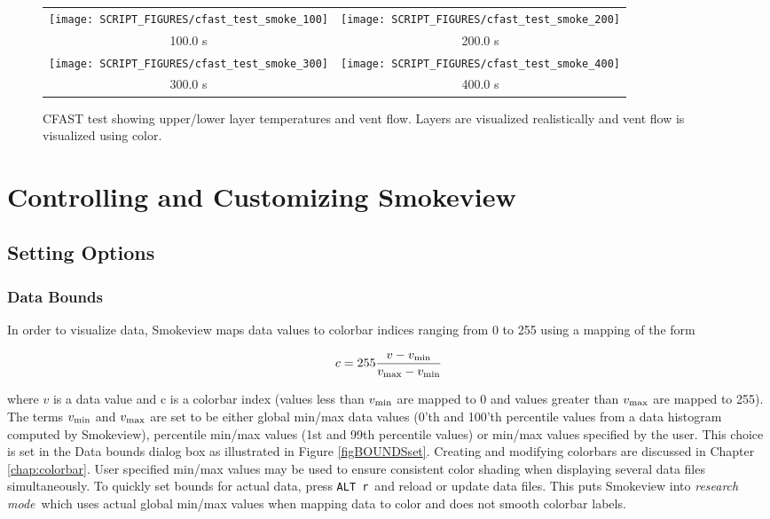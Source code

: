 \documentclass[11pt,twoside]{book}
\begin{document}
\begin{figure}[bph]
\begin{center}
\begin{tabular}{cc}
\texttt{[image: SCRIPT\_FIGURES/cfast\_test\_smoke\_100]}&
\texttt{[image: SCRIPT\_FIGURES/cfast\_test\_smoke\_200]}\\
100.0 s&200.0 s\\
\texttt{[image: SCRIPT\_FIGURES/cfast\_test\_smoke\_300]}&
\texttt{[image: SCRIPT\_FIGURES/cfast\_test\_smoke\_400]}\\
300.0 s&400.0 s\\
\end{tabular}
\end{center}
\caption{CFAST test showing upper/lower layer temperatures and vent flow.
Layers are visualized realistically and vent flow
is visualized using color.}
\label{figcfastsmoke}%
\end{figure}

\part{Controlling and Customizing Smokeview}

\chapter{Setting Options}
\label{chapter:settingoptions}
\section{Data Bounds}

In order to visualize data, Smokeview maps data values to colorbar indices ranging from 0 to 255 using a mapping of the form

\begin{eqnarray*}
c=255 \frac{v-v_{\rm min}}{v_{\rm max}-v_{\rm min}}
\end{eqnarray*}

\noindent where $v$ is a data value and c is a colorbar index (values less than $v_{\rm min}$ are mapped to 0 and values greater than $v_{\rm max}$ are mapped to 255). The terms $v_{\rm min}$ and $v_{\rm max}$ are set to be either global min/max data values (0'th and 100'th percentile values from a data histogram computed by Smokeview), percentile min/max values (1st and 99th percentile values) or min/max values specified by the user.  This choice is set in the Data bounds dialog box as illustrated in Figure \ref{figBOUNDSset}.
Creating and modifying colorbars are discussed in Chapter \ref{chap:colorbar}.
User specified min/max values may be used to ensure consistent color shading when
displaying several data files simultaneously.
To quickly set bounds for actual data, press {\tt ALT r}\ and reload or update data files. This puts Smokeview into {\em research mode}\ which uses actual global min/max values when mapping data to color and does not smooth colorbar labels.
\end{document}
